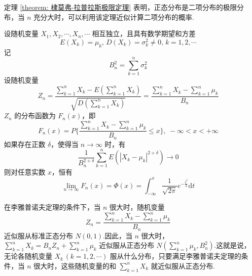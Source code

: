 定理 \ref{theorem: 棣莫弗-拉普拉斯极限定理} 表明，正态分布是二项分布的极限分布，当 $n$ 充分大时，可以利用该定理近似计算二项分布的概率.

\begin{theorem}[][李雅普诺夫定理]
    设随机变量 $X_1,X_2,\cdots,X_n,\cdots$ 相互独立，且具有数学期望和方差
    $$
    E(X_k) = \mu_k, \, D(X_k) = \sigma_k^2 \not= 0, \, k=1,2,\cdots
    $$
    记
    $$
    B_n^2 = \sum_{k=1}^n \sigma_k^2
    $$
    设随机变量
    $$
    Z_n = \dfrac{\displaystyle\sum_{k=1}^n X_k - E(\displaystyle\sum_{k=1}^n X_k)}{\sqrt{D(\displaystyle\sum_{k=1}^n X_k)}} = \dfrac{\displaystyle\sum_{k=1}^n X_k - \displaystyle\sum_{k=1}^n \mu_k}{B_n}
    $$
    $Z_n$ 的分布函数为 $F_n(x)$，即
    $$
    F_n(x) = P \Bigg\{ \dfrac{\displaystyle\sum_{k=1}^n X_k - \displaystyle\sum_{k=1}^n \mu_k}{B_n} \leqslant x \Bigg\}, \; -\infty < x < +\infty
    $$
    如果存在正数 $\delta$，使得当 $n \to \infty$ 时，有
    $$
    \dfrac{1}{B_n^{2+\delta}} \sum_{k=1}^n E(|X_k - \mu_k|^{2+\delta}) \to 0
    $$
    则对任意实数 $x$，恒有
    $$
    \lim_{n \to \infty} F_n(x) = \varPhi(x) = \int_{-\infty}^x \dfrac{1}{\sqrt{2\pi}} e^{-\frac{t^2}{2}} \text{d}t
    $$
\end{theorem}

在李雅普诺夫定理的条件下，当 $n$ 很大时，随机变量
$$
Z_n = \dfrac{\displaystyle\sum_{k=1}^n X_k - \displaystyle\sum_{k=1}^n \mu_k}{B_n}
$$
近似服从标准正态分布 $N(0,1)$.因此，当 $n$ 很大时，$\displaystyle\sum_{k=1}^n X_k = B_n Z_n + \displaystyle\sum_{k=1}^n \mu_k$ 近似服从正态分布 $N(\displaystyle\sum_{k=1}^n \mu_k, B_n^2)$.这就是说，无论各随机变量 $X_k \, (k=1,2,\cdots)$ 服从什么分布，只要满足李雅普诺夫定理的条件，当 $n$ 很大时，这些随机变量的和 $\displaystyle\sum_{k=1}^n X_k$ 就近似服从正态分布.